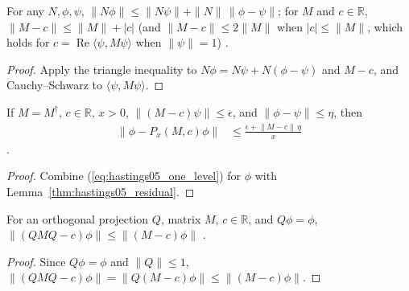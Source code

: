 \begin{lemma}
    \label{thm:hastings05_residual}
    \leanok
    For any $N,\phi,\psi$,
    $\|N\phi\|\le\|N\psi\|+\|N\|\,\|\phi-\psi\|$; for $M$ and $c\in\mathbb R$,
    $\|M-c\|\le\|M\|+|c|$ (and $\|M-c\|\le2\|M\|$ when $|c|\le\|M\|$, which
    holds for $c=\operatorname{Re}\langle\psi,M\psi\rangle$ when $\|\psi\|=1$)
    \cite[lines 690--695]{Hastings2006Solving}.
\end{lemma}
\begin{proof}\leanok
    Apply the triangle inequality to $N\phi=N\psi+N(\phi-\psi)$ and $M-c$, and
    Cauchy--Schwarz to $\langle\psi,M\psi\rangle$.
\end{proof}

\begin{lemma}
    \label{thm:hastings05_one_level_combined}
    \leanok
    If $M=M^\dagger$, $c\in\mathbb R$, $x>0$, $\|(M-c)\psi\|\le\epsilon$, and
    $\|\phi-\psi\|\le\eta$, then
    \begin{align}
        \lVert\phi-P_x(M,c)\phi\rVert
         & \le\frac{\epsilon+\lVert M-c\rVert\,\eta}{x}
        \label{eq:hastings05_one_level_combined}
    \end{align}
    \cite[lines 690--699]{Hastings2006Solving}.
\end{lemma}
\begin{proof}\leanok
    Combine (\ref{eq:hastings05_one_level}) for $\phi$ with
    Lemma~\ref{thm:hastings05_residual}.
\end{proof}

\begin{lemma}
    \label{thm:hastings05_compression}
    \leanok
    For an orthogonal projection $Q$, matrix $M$, $c\in\mathbb R$, and
    $Q\phi=\phi$, $\|(QMQ-c)\phi\|\le\|(M-c)\phi\|$
    \cite[lines 673--689]{Hastings2006Solving}.
\end{lemma}
\begin{proof}\leanok
    Since $Q\phi=\phi$ and $\|Q\|\le1$,
    $\|(QMQ-c)\phi\|=\|Q(M-c)\phi\|\le\|(M-c)\phi\|$.
\end{proof}

